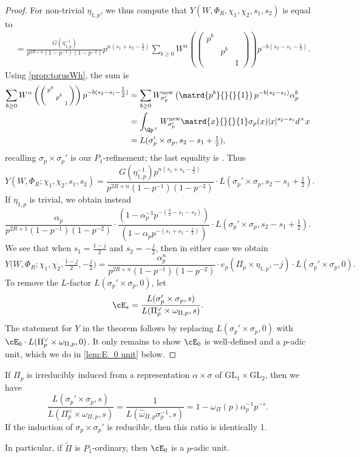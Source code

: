 \documentclass[10pt,reqno,a4paper]{amsart}
\newcommand{\sdthree}[3]{\left(\begin{smallmatrix}#1 \\ & #2\\ && #3\end{smallmatrix}\right)}
\newcommand{\Poref}{\tilde\Pi}
\newcommand{\omegahat}{\widehat{\omega}}
\newcommand{\GL}{\mathrm{GL}}
\begin{document}
\begin{proof}
For non-trivial $\eta_{1,p}$, we thus compute that $ Y(W, \Phi_R, \chi_1, \chi_2, s_1, s_2)$ is equal to
\begin{align*}
	&= \frac{G(\eta_{1,p}^{-1})}{p^{2R+n}(1-p^{-1})(1-p^{-2})} p^{n(s_1 + s_2 - \tfrac{3}{2})} \sum_{b \ge 0} W^{\alpha}\left(\sdthree{p^b}{p^b}{1}\right) p^{-b(s_2 - s_1-\tfrac{1}{2})}.
	\end{align*}
	Using \cref{prop:torusWh}, the sum is
	\begin{align*}
		\sum_{b \ge 0} W^{\alpha}\left(\sdthree{p^b}{p^b}{1}\right) p^{-b(s_2 - s_1-\tfrac{1}{2})} &=  \sum_{b \ge 0} W^{\mathrm{new}}_{\sigma_p'}\left(\matrd{p^b}{}{}{1}\right) p^{-b(s_2 - s_1)}\alpha_p^b\\
		&= \int_{\Qp^\times}W_{\sigma_p'}^{\mathrm{new}}\matrd{x}{}{}{1}\sigma_p(x)|x|^{s_2-s_1}d^\times x\\
		& = L(\sigma_p'\times\sigma_p, s_2-s_1+\tfrac{1}{2}),
		\end{align*}
	recalling $\sigma_p \times \sigma_p'$ is our $P_1$-refinement; the last equality is \cite[Prop.\ 6.17]{Gel75}. Thus
\[
Y(W, \Phi_R; \chi_1, \chi_2, s_1, s_2) = \frac{G(\eta_{1,p}^{-1}) p^{n(s_1 + s_2 -\tfrac{3}{2})}}{p^{2R+n}(1-p^{-1})(1-p^{-2})} \cdot L(\sigma_p' \times \sigma_p,s_2 - s_1 + \tfrac{1}{2}).
\]
If $\eta_{1,p}$ is trivial, we obtain instead
\[
\frac{\alpha_p}{p^{2R+1}(1 - p^{-1})(1 - p^{-2})} \cdot \frac{(1 - \alpha_p^{-1}p^{-(\tfrac{3}{2}-s_1-s_2)})}{(1 - \alpha_p p^{-(s_1 + s_2 - \tfrac{1}{2})})} \cdot L(\sigma_p' \times \sigma_p, s_2 - s_1 + \tfrac{1}{2}).
\]
We see that when $s_1 = \tfrac{1-j}{2}$ and $s_2 = -\tfrac{j}{2}$,
then in either case we obtain
\[
Y\big(W, \Phi_R; \chi_1, \chi_2, \tfrac{1-j}{2}, -\tfrac{j}{2}\big) = \frac{\alpha_p^n}{p^{2R+n}(1-p^{-1})(1-p^{-2})} \cdot e_p(\Pi_p \times \eta_{1,p}, -j) \cdot L(\sigma_p' \times \sigma_p,0).
\]
To remove the $L$-factor $L(\sigma_p'\times\sigma_p,0)$, let
\begin{equation}\label{eq:E_s}
	\cE_s = \frac{L(\sigma_p' \times \sigma_p,s)}{L(\Pi_p^\vee \times \omega_{\Pi,p}, s)}.
\end{equation}
The statement for $Y$ in the theorem follows by replacing $L(\sigma_p'\times\sigma_p,0)$ with $\cE_0\cdot L(\Pi_p^\vee \times \omega_{\Pi,p}, 0)$. It only remains to show $\cE_0$ is well-defined and a $p$-adic unit, which we do in \cref{lem:E_0 unit} below.
\end{proof}


\begin{lemma}\label{lem:E_0 unit}
If $\Pi_p$ is irreducibly induced from a representation $\alpha \times \sigma$ of $\GL_1 \times \GL_2$, then we have
\[
\frac{L(\sigma_p' \times \sigma_p, s)}{L(\Pi_p^\vee \times \omega_{\Pi,p}, s)} = \frac{1}{L(\omegahat_{\Pi, p} \sigma_p^{-1} , s)} = 1-\omega_{\Pi}(p)\alpha_p^{-1}p^{-s}.
\]
If the induction of $\sigma_p \times \sigma_p'$ is reducible, then this ratio is identically 1.

In particular, if $\Poref$ is $P_1$-ordinary, then $\cE_0$ is a $p$-adic unit.
\end{lemma}
\end{document}
